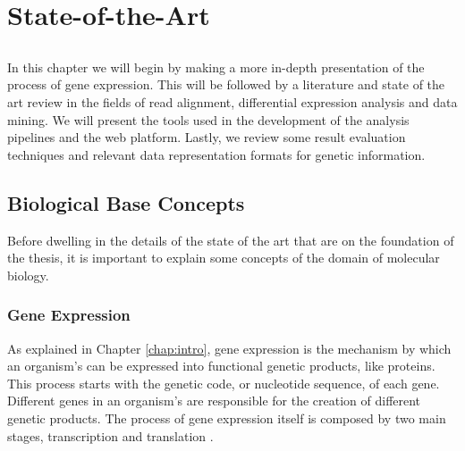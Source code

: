 \chapter{State-of-the-Art} \label{chap:sota}

\section*{}


In this chapter we will begin by making a more in-depth presentation of the
process of gene expression. This will be followed by a literature and state of
the art review in the fields of read alignment, differential expression analysis
and data mining. We will present the tools used in the development of the
analysis pipelines and the web platform. Lastly, we review some result
evaluation techniques and relevant data representation formats for genetic
information.

\section{Biological Base Concepts}


Before dwelling in the details of the state of the art that are on the
foundation of the thesis, it is important to explain some concepts of the
domain of molecular biology.

\subsection{Gene Expression}

As explained in Chapter \ref{chap:intro}, gene expression is the mechanism by
which an organism's \dna{} can be expressed into functional genetic products,
like proteins. This process starts with the genetic code, or nucleotide
sequence, of each gene. Different genes in an organism's \dna{} are responsible
for the creation of different genetic products. The process of gene expression
itself is composed by two main stages, transcription and translation
\cite{leic:gene_expr}.

